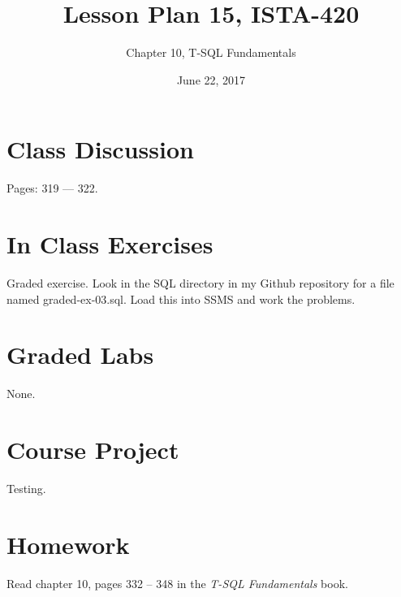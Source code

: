 \documentclass{article}
\title{Lesson Plan 15, ISTA-420}
\author{Chapter 10, T-SQL Fundamentals}
\date{June 22, 2017}
\begin{document}
    

    \maketitle{}

    \section{Class Discussion}

    Pages: 319 --- 322.

    \section{In Class Exercises}

    Graded exercise. Look in the SQL directory in my Github repository for a file named graded-ex-03.sql. Load this into SSMS and work the problems.

    \section{Graded Labs}

    None.

    \section{Course Project}


    Testing.

    \section{Homework}


        Read chapter 10, pages 332  -- 348  in the \textit{T-SQL Fundamentals} book.
\end{document}
